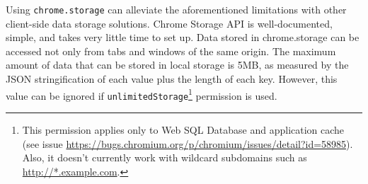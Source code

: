 Using \verb;chrome.storage; can alleviate the aforementioned limitations with other client-side data storage solutions. Chrome Storage API is well-documented, simple, and takes very little time to set up. Data stored in chrome.storage can be accessed not only from tabs and windows of the same origin. The maximum amount of data that can be stored in local storage is 5MB, as measured by the JSON stringification of each value plus the length of each key. However, this value can be ignored if \verb;unlimitedStorage;\footnote{This permission applies only to Web SQL Database and application cache (see issue \url{https://bugs.chromium.org/p/chromium/issues/detail?id=58985}). Also, it doesn't currently work with wildcard subdomains such as \url{http://*.example.com}.} permission is used.
